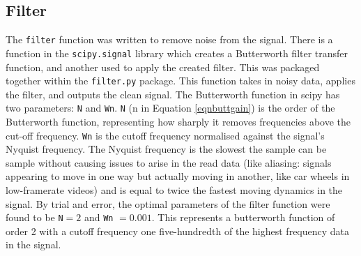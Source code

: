 \documentclass[twoside,a4]{report}
\def\br{\newline \newline \noindent}
\begin{document}
	\subsection*{Filter}
	The \texttt{filter} function was written to remove noise from the signal. There is a function in the \texttt{scipy.signal} library which creates a Butterworth filter transfer function, and another used to apply the created filter. This was packaged together within the \texttt{filter.py} package. This function takes in noisy data, applies the filter, and outputs the clean signal. 
	\br
	The Butterworth function in scipy has two parameters: \texttt{N} and \texttt{Wn}. \texttt{N} (n in Equation \ref{eqnbuttgain}) is the order of the Butterworth function, representing how sharply it removes frequencies above the cut-off frequency. \texttt{Wn} is the cutoff frequency normalised against the signal's Nyquist frequency. The Nyquist frequency is the slowest the sample can be sample without causing issues to arise in the read data (like aliasing: signals appearing to move in one way but actually moving in another, like car wheels in low-framerate videos) and is equal to twice the fastest moving dynamics in the signal. By trial and error, the optimal parameters of the filter function were found to be \texttt{N}$ = 2$ and \texttt{Wn} $ = 0.001$. This represents a butterworth function of order 2 with a cutoff frequency one five-hundredth of the highest frequency data in the signal.
	
\end{document}
